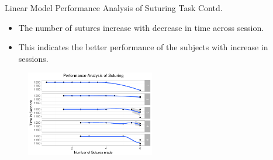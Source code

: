 \documentclass{beamer}
\begin{document}
 \begin{frame}{Linear Model}{ Performance Analysis of Suturing Task Contd.}
\begin{itemize}
  \item {The number of sutures increase with decrease in time across session.}
   \item {This indicates the better performance of the subjects with increase in sessions.}
      \end{itemize}\begin{figure}
	\centering
	\includegraphics[width=0.5\textwidth]{SuturingVsTime.pdf}
	\centering
\end{figure}
 \end{frame}
 
\end{document}
